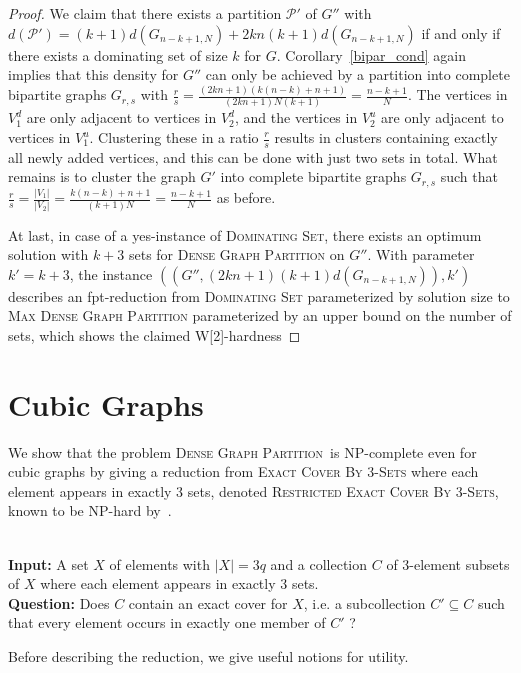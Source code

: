 \documentclass[a4paper,USenglish,cleveref, autoref]{lipics-v2021}
\newcommand\DGP{\textsc{Dense Graph Partition}}
\newcommand{\defprob}[3]{
\begin{center}
{\begin{minipage}{.95\textwidth}
\noindent{\sc #1}\\\nopagebreak
{\bf Input:} #2 \\\nopagebreak
{\bf Question:} #3
\end{minipage}}
\end{center}
}
\begin{document}
\begin{proof}
We claim that there exists a partition $\mathcal{P'}$ of $G''$ with  $d(\mathcal{P'})=(k+1)d(G_{n-k+1,N})+2kn(k+1)d(G_{n-k+1,N})$ if and only if there exists a dominating set of size $k$ for $G$.  Corollary~\ref{bipar_cond} again implies that this density for  $G''$ can only be achieved by a partition into complete bipartite graphs $G_{r,s}$ with $\frac rs=\frac{(2kn+1)(k(n-k)+n+1)}{(2kn+1)N(k+1)}=\frac{n-k+1}{N}$. The vertices in $V_1^d$ are only adjacent to vertices in $V_2^d$, and the vertices in $V_2^u$ are only adjacent to vertices in $V_1^u$. Clustering these in a ratio $\frac rs$ results in clusters containing exactly all newly added vertices, and this can be done with just two sets in total. 
What remains is to cluster the graph $G'$ into complete bipartite graphs $G_{r,s}$ such that $\frac rs=\frac{|V_1|}{|V_2|}=\frac{k(n-k)+n+1}{(k+1)N}=\frac{n-k+1}{N}$ as before.

At last, in case of a yes-instance of \textsc{Dominating Set}, there exists an optimum solution with $k+3$ sets for \textsc{Dense Graph Partition} on $G''$. With parameter $k'=k+3$, the instance $((G'',(2kn+1)(k+1)d(G_{n-k+1,N})),k')$ describes an fpt-reduction from \textsc{Dominating Set} parameterized by solution size to  \textsc{Max Dense Graph Partition} parameterized by an upper bound on the number of sets, which shows the claimed W[2]-hardness
\end{proof}






 
\section{Cubic Graphs }\label{sec4}
\label{sec:cubicDense}

We show that the problem \DGP~is NP-complete even for cubic graphs by giving a reduction from \textsc{Exact Cover By 3-Sets} where each element appears in exactly 3 sets, denoted \textsc{Restricted Exact Cover By 3-Sets},  known to be NP-hard by~\cite{Gonzalez85}.

 
\defprob{Restricted Exact Cover By 3-Sets (RX3C)}{A set $X$ of elements with $|X| = 3q$ and a collection $C$ of 3-element subsets of $X$ where each element appears in exactly 3 sets.}{Does $C$ contain an exact cover for $X$, i.e. a subcollection $C' \subseteq C$ such that every element occurs in exactly one member of $C'$ ?}

\noindent
Before describing the reduction, we give useful notions for utility.
\end{document}
